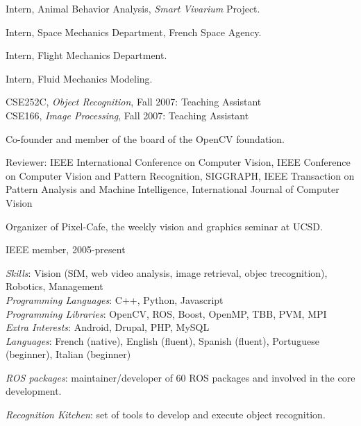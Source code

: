 \begin{llist}
Intern, Animal Behavior Analysis, {\em Smart Vivarium} Project.

Intern, Space Mechanics Department, French Space Agency.

 
Intern, Flight Mechanics Department.

 
Intern, Fluid Mechanics Modeling.

CSE252C, {\em Object Recognition}, Fall 2007: Teaching Assistant\\
CSE166, {\em Image Processing}, Fall 2007: Teaching Assistant


Co-founder and member of the board of the OpenCV foundation.

Reviewer: IEEE International Conference on Computer Vision, IEEE Conference on Computer Vision and Pattern Recognition, 
SIGGRAPH, IEEE Transaction on Pattern Analysis and Machine Intelligence, International Journal of Computer Vision

Organizer of Pixel-Cafe, the weekly vision and graphics seminar at UCSD.

IEEE member, 2005-present

{\em Skills}: Vision (SfM, web video analysis, image retrieval, objec trecognition), Robotics, Management \\
{\em Programming Languages}: C++, Python, Javascript \\
{\em Programming Libraries}: OpenCV, ROS, Boost, OpenMP, TBB, PVM, MPI \\
{\em Extra Interests}: Android, Drupal, PHP, MySQL \\
{\em Languages}: French (native), English (fluent), Spanish (fluent), Portuguese (beginner), Italian (beginner)

{\em ROS packages}: maintainer/developer of 60 ROS packages and involved in the core development.

{\em Recognition Kitchen}: set of tools to develop and execute object recognition.


\end{llist}
